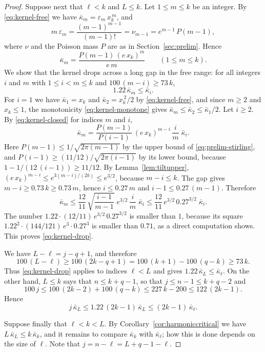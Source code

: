 \documentclass{amsart}
\theoremstyle{definition}
\theoremstyle{remark}
\numberwithin{equation}{section}
\begin{document}
\begin{proof}
Suppose next that $\ell<k$ and $L\le k$. Let $1\le m\le k$ be an integer.
By \eqref{eq:kernel-free} we have $\bar\kappa_m=\varepsilon_m\,x_k^{\,m}$,
and
\[
m\,\varepsilon_m=\frac{(m-1)^{m-1}}{(m-1)!}=\nu_{m-1}=e^{m-1}\,P(m-1),
\]
where $\nu$ and the Poisson mass $P$ are as in Section~\ref{sec:prelim}.
Hence
\begin{equation}\label{eq:kernel-closed}
\bar\kappa_m=\frac{P(m-1)\,(e\,x_k)^m}{e\,m}\qquad(1\le m\le k).
\end{equation}
We show that the kernel drops across a long gap in the free range:
for all integers $i$ and $m$ with $1\le i<m\le k$ and
$100\,(m-i)\ge73\,k$,
\begin{equation}\label{eq:kernel-drop}
1.22\,\bar\kappa_m\le\bar\kappa_i .
\end{equation}
For $i=1$ we have $\bar\kappa_1=x_k$ and $\bar\kappa_2=x_k^{\,2}/2$ by
\eqref{eq:kernel-free}, and since $m\ge2$ and $x_k\le1$, the monotonicity
\eqref{eq:kernel-monotone} gives
$\bar\kappa_m\le\bar\kappa_2\le\bar\kappa_1/2$. Let $i\ge2$. By
\eqref{eq:kernel-closed} for indices $m$ and $i$,
\[
\bar\kappa_m=\frac{P(m-1)}{P(i-1)}\,(e\,x_k)^{m-i}\,\frac{i}{m}\;
\bar\kappa_i .
\]
Here $P(m-1)\le1/\sqrt{2\pi(m-1)}$ by the upper bound of
\eqref{eq:prelim-stirling}, and
$P(i-1)\ge(11/12)/\sqrt{2\pi(i-1)}$ by its lower bound,
because $1-1/(12\,(i-1))\ge11/12$. By Lemma~\ref{lem:tiltupper},
$(e\,x_k)^{m-i}\le e^{3(m-i)/(2k)}\le e^{3/2}$, because $m-i\le k$. The
gap gives $m-i\ge0.73\,k\ge0.73\,m$, hence $i\le0.27\,m$ and
$i-1\le0.27\,(m-1)$. Therefore
\[
\bar\kappa_m\le\frac{12}{11}\,\sqrt{\frac{i-1}{m-1}}\;e^{3/2}\,\frac{i}{m}\;
\bar\kappa_i\le\frac{12}{11}\,e^{3/2}\,0.27^{3/2}\;\bar\kappa_i .
\]
The number $1.22\cdot(12/11)\,e^{3/2}\,0.27^{3/2}$ is smaller than $1$,
because its square $1.22^2\cdot(144/121)\,e^3\cdot0.27^3$ is smaller than
$0.71$, as a direct computation shows. This proves \eqref{eq:kernel-drop}.

We have $L-\ell=j-q+1$, and
therefore
\[
100\,(L-\ell)\ge100\,(2k-q+1)=100\,(k+1)-100\,(q-k)\ge73\,k .
\]
Thus \eqref{eq:kernel-drop} applies to indices $\ell<L$ and gives
$1.22\,\bar\kappa_L\le\bar\kappa_\ell$. On the other hand, $L\le k$ says that
$n\le k+q-1$, so that $j\le n-1\le k+q-2$ and
\[
100\,j\le100\,(2k-2)+100\,(q-k)\le227\,k-200\le122\,(2k-1).
\]
Hence
\[
j\,\bar\kappa_L\le1.22\,(2k-1)\,\bar\kappa_L\le(2k-1)\,\bar\kappa_\ell .
\]

Suppose finally that $\ell<k<L$. By Corollary~\ref{cor:harmoniccritical} we
have $L\,\bar\kappa_L\le k\,\bar\kappa_k$, and it remains to compare
$\bar\kappa_k$ with $\bar\kappa_\ell$; how this is done depends on the size of
$\ell$. Note that $j=n-\ell=L+q-1-\ell$.


\end{proof}
\end{document}
